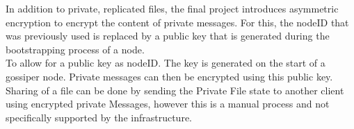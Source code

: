 \documentclass{article}
\begin{document}
 In addition to private, replicated files, the final project introduces asymmetric encryption to encrypt the content of private messages. 
For this, the nodeID that was previously used is replaced by a public key that is generated during the bootstrapping process of a node. 
\\
To allow for a public key as nodeID. The key is generated on the start of a gossiper node. Private messages can then be encrypted using this public key.
\\
Sharing of a file can be done by sending the Private File state to another client using encrypted private Messages, however this is a manual process and not specifically supported by the infrastructure.


\end{document}
